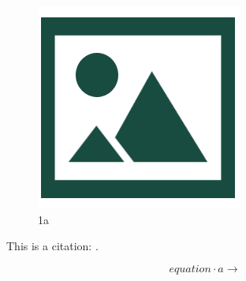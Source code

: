 \documentclass[12pt]{article}
\begin{document}
\begin{figure}[htb]
\includegraphics[width=.8\linewidth]{img/dummy}	
\caption{1a}
\label{fig:fig2}
\end{figure}

This is a citation: \cite{breiman2001random}.


\[ equation \cdot a \rightarrow \]



\end{document}
